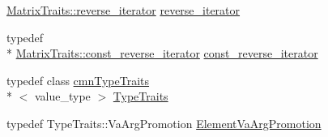 \begin{DoxyCompactItemize}
\hyperlink{classvct_fixed_size_matrix_traits_aa132098455575ae9bc4962c994273baa}{Matrix\-Traits\-::reverse\-\_\-iterator} \hyperlink{classvct_fixed_size_matrix_afd9b320069fbb9b20f3dc11d767b57c9}{reverse\-\_\-iterator}
\item 
typedef \\*
\hyperlink{classvct_fixed_size_matrix_traits_a362cff0931f811552609307e80af3eab}{Matrix\-Traits\-::const\-\_\-reverse\-\_\-iterator} \hyperlink{classvct_fixed_size_matrix_a0f130f24813be72cfe2c68af25f55c9a}{const\-\_\-reverse\-\_\-iterator}
\item 
typedef class \hyperlink{classcmn_type_traits}{cmn\-Type\-Traits}\\*
$<$ value\-\_\-type $>$ \hyperlink{classvct_fixed_size_matrix_af4fb2be82acfa34201da6c7f21ad0e68}{Type\-Traits}
\item 
typedef Type\-Traits\-::\-Va\-Arg\-Promotion \hyperlink{classvct_fixed_size_matrix_a68a3a606814298fd97f392dce89f9c7d}{Element\-Va\-Arg\-Promotion}
\end{DoxyCompactItemize}
